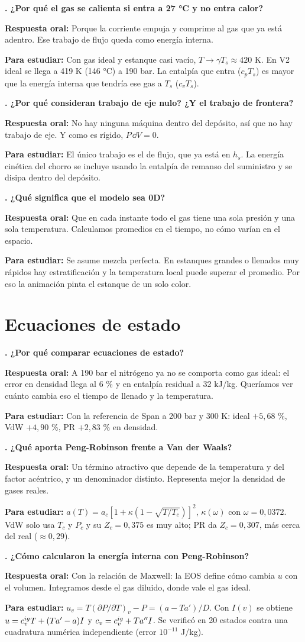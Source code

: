 \documentclass[11pt]{article}
\newcounter{preg}
\newcommand{\pregunta}[3]{\stepcounter{preg}%
\begin{tcolorbox}[colback=white,colframe=tinta!25,boxrule=0.5pt,sharp corners,left=6pt,right=6pt,top=4pt,bottom=4pt,breakable]
\textbf{\color{tinta}\thepreg. #1}\par\smallskip
\textbf{Respuesta oral:} #2\par\smallskip
{\color{gris}\small\textbf{Para estudiar:} #3}
\end{tcolorbox}}
\begin{document}
\pregunta{¿Por qué el gas se calienta si entra a 27 °C y no entra calor?}
{Porque la corriente empuja y comprime al gas que ya está adentro. Ese trabajo de flujo queda como energía interna.}
{Con gas ideal y estanque casi vacío, $T\to\gamma T_s\approx420$ K. En V2 ideal se llega a 419 K (146 °C) a 190 bar.
La entalpía que entra ($c_pT_s$) es mayor que la energía interna que tendría ese gas a $T_s$ ($c_vT_s$).}

\pregunta{¿Por qué consideran trabajo de eje nulo? ¿Y el trabajo de frontera?}
{No hay ninguna máquina dentro del depósito, así que no hay trabajo de eje. Y como es rígido, $P\,\dd V=0$.}
{El único trabajo es el de flujo, que ya está en $h_s$. La energía cinética del chorro se incluye usando la
entalpía de remanso del suministro y se disipa dentro del depósito.}

\pregunta{¿Qué significa que el modelo sea 0D?}
{Que en cada instante todo el gas tiene una sola presión y una sola temperatura. Calculamos promedios en el tiempo, no cómo varían en el espacio.}
{Se asume mezcla perfecta. En estanques grandes o llenados muy rápidos hay estratificación y la temperatura
local puede superar el promedio. Por eso la animación pinta el estanque de un solo color.}

\section{Ecuaciones de estado}
\pregunta{¿Por qué comparar ecuaciones de estado?}
{A 190 bar el nitrógeno ya no se comporta como gas ideal: el error en densidad llega al 6 \% y en entalpía residual a 32 kJ/kg. Queríamos ver cuánto cambia eso el tiempo de llenado y la temperatura.}
{Con la referencia de Span a 200 bar y 300 K: ideal $+5{,}68$ \%, VdW $+4{,}90$ \%, PR $+2{,}83$ \% en densidad.}

\pregunta{¿Qué aporta Peng-Robinson frente a Van der Waals?}
{Un término atractivo que depende de la temperatura y del factor acéntrico, y un denominador distinto. Representa mejor la densidad de gases reales.}
{$a(T)=a_c[1+\kappa(1-\sqrt{T/T_c})]^2$, $\kappa(\omega)$ con $\omega=0{,}0372$. VdW solo usa $T_c$ y $P_c$ y su
$Z_c=0{,}375$ es muy alto; PR da $Z_c=0{,}307$, más cerca del real ($\approx0{,}29$).}

\pregunta{¿Cómo calcularon la energía interna con Peng-Robinson?}
{Con la relación de Maxwell: la EOS define cómo cambia $u$ con el volumen. Integramos desde el gas diluido, donde vale el gas ideal.}
{$u_v=T(\partial P/\partial T)_v-P=(a-Ta')/D$. Con $I(v)$ se obtiene $u=c_v^{ig} T+(Ta'-a)I$ y $c_v=c_v^{ig}+Ta''I$.
Se verificó en 20 estados contra una cuadratura numérica independiente (error $10^{-11}$ J/kg).}
\end{document}

